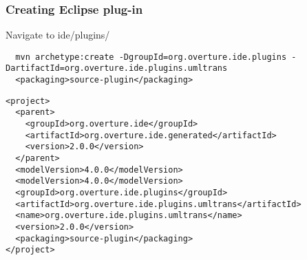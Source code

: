 \begin{frame}[fragile]
  \frametitle{Creating Eclipse plug-in}

Navigate to ide/plugins/
  \begin{lstlisting}
  mvn archetype:create -DgroupId=org.overture.ide.plugins -DartifactId=org.overture.ide.plugins.umltrans 
  <packaging>source-plugin</packaging>
  \end{lstlisting}

\begin{lstlisting}
<project>
  <parent>
    <groupId>org.overture.ide</groupId>
    <artifactId>org.overture.ide.generated</artifactId>
    <version>2.0.0</version>
  </parent>
  <modelVersion>4.0.0</modelVersion>
  <modelVersion>4.0.0</modelVersion>
  <groupId>org.overture.ide.plugins</groupId>
  <artifactId>org.overture.ide.plugins.umltrans</artifactId>
  <name>org.overture.ide.plugins.umltrans</name>
  <version>2.0.0</version>
  <packaging>source-plugin</packaging>
</project>
\end{lstlisting}
\end{frame}

